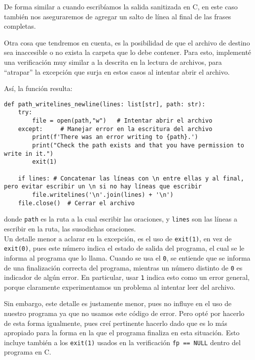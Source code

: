 \documentclass[a4paper]{article}
\begin{document}
De forma similar a cuando escribíamos la salida sanitizada en C, en este caso también nos aseguraremos de agregar un salto de línea al final de las frases completas.

Otra cosa que tendremos en cuenta, es la posibilidad de que el archivo de destino sea inaccesible o no exista la carpeta que lo debe contener. Para esto, implementé una verificación muy similar a la descrita en la lectura de archivos, para ``atrapar'' la excepción que surja en estos casos al intentar abrir el archivo.

Así, la función resulta:
\begin{verbatim}
def path_writelines_newline(lines: list[str], path: str):
    try:
        file = open(path,"w")   # Intentar abrir el archivo
    except:     # Manejar error en la escritura del archivo
        print(f'There was an error writing to {path}.')
        print("Check the path exists and that you have permission to write in it.")
        exit(1)

    if lines: # Concatenar las líneas con \n entre ellas y al final, pero evitar escribir un \n si no hay líneas que escribir
        file.writelines('\n'.join(lines) + '\n')
    file.close()  # Cerrar el archivo
\end{verbatim}

\noindent donde \texttt{path} es la ruta a la cual escribir las oraciones, y \texttt{lines} son las líneas a escribir en la ruta, las susodichas oraciones. \\

Un detalle menor a aclarar en la excepción, es el uso de \texttt{exit(1)}, en vez de \texttt{exit(0)}, pues este número indica el estado de salida del programa, el cual se le informa al programa que lo llama. Cuando se usa el \texttt{0}, se entiende que se informa de una finalización correcta del programa, mientras un número distinto de \texttt{0} es indicador de algún error. En particular, usar \texttt{1} indica esto como un error general, porque claramente experimentamos un problema al intentar leer del archivo. 

Sin embargo, este detalle es justamente menor, pues no influye en el uso de nuestro programa ya que no usamos este código de error. Pero opté por hacerlo de esta forma igualmente, pues creí pertinente hacerlo dado que es lo más apropiado para la forma en la que el programa finaliza en esta situación. Esto incluye también a los \texttt{exit(1)} usados en la verificación \texttt{fp == NULL} dentro del programa en C. \\
\end{document}
